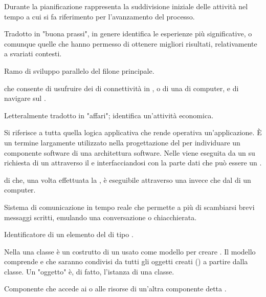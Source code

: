 {Durante la pianificazione rappresenta la suddivisione iniziale delle attività nel tempo a cui si fa riferimento per l'avanzamento del processo.}

{Tradotto in "buona prassi", in genere identifica le esperienze più significative, o comunque quelle che hanno permesso di ottenere migliori risultati, relativamente a svariati contesti.}

{Ramo di sviluppo parallelo del filone principale.}

{ che consente di usufruire dei  di connettività in , o di una  di computer, e di navigare sul .}

{Letteralmente tradotto in "affari"; identifica un'attività economica.}

{Si riferisce a tutta quella logica applicativa che rende operativa un'applicazione. \`{E} un termine largamente utilizzato nella progettazione del  per individuare un componente software di una architettura software. Nelle  viene eseguita da un  su richiesta di un  attraverso il  e interfacciandosi con la parte dati che può essere un .}

{ di  che, una volta effettuata la , è eseguibile attraverso una  invece che dal  di un computer.}




{Sistema di comunicazione in tempo reale che permette a più  di scambiarsi brevi messaggi scritti, emulando una conversazione o chiacchierata.}

{Identificatore di un elemento del  di tipo .}

{Nella   una classe è un costrutto di un  usato come modello per creare . Il modello comprende  e  che saranno condivisi da tutti gli oggetti creati () a partire dalla classe. Un "oggetto" è, di fatto, l'istanza di una classe.}

{Componente che accede ai  o alle risorse di un'altra componente detta .} 

